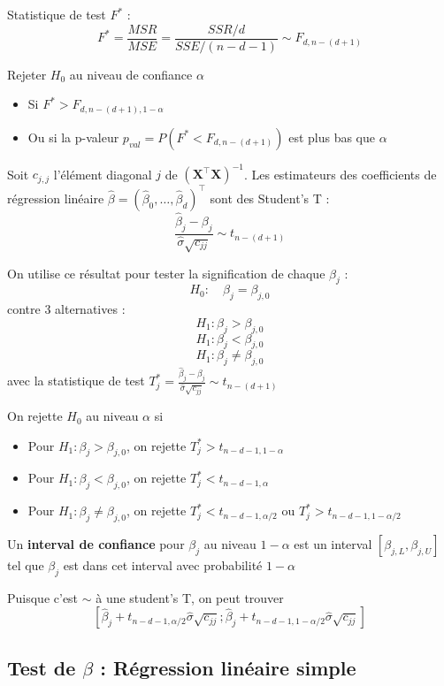 \documentclass[12pt,a4paper]{article}
\begin{document}
Statistique de test $F^*$ :
$$ F^* = \frac{MSR}{MSE} = \frac{SSR / d}{SSE / (n-d-1)} \sim F_{d, n-(d+1)} $$

Rejeter $H_0$ au niveau de confiance $\alpha$
\begin{itemize}
    \item Si $F^* > F_{d,n-(d+1),1-\alpha}$
    \item Ou si la p-valeur $p_{val} = P(F^* < F_{d,n-(d+1)})$ est plus bas que $\alpha$
\end{itemize}

Soit $c_{j,j}$ l'élément diagonal $j$ de $(\mathbf{X}^\top \mathbf{X})^{-1}$. Les estimateurs des coefficients de régression linéaire $\hat{\beta} = (\hat{\beta}_0, \dots, \hat{\beta}_d)^\top$ sont des Student's T :
$$\frac{\hat{\beta}_j - \beta_j}{\hat{\sigma}\sqrt{c_{jj}}} \sim t_{n-(d+1)}$$

\medskip

On utilise ce résultat pour tester la signification de chaque $\beta_j$ :
$$H_0 : \quad \beta_j = \beta_{j,0}$$
contre 3 alternatives :
$$H_1 : \beta_j > \beta_{j,0}$$
$$H_1 : \beta_j < \beta_{j,0}$$
$$H_1 : \beta_j \neq \beta_{j,0}$$
avec la statistique de test $T_j^* = \frac{\hat{\beta}_j - \beta_j}{\hat{\sigma}\sqrt{c_{jj}}} \sim t_{n-(d+1)}$

On rejette $H_0$ au niveau $\alpha$ si
\begin{itemize}
    \item Pour $H_1 : \beta_j > \beta_{j,0}$, on rejette $T_j^* > t_{n-d-1,1-\alpha}$
    \item Pour $H_1 : \beta_j < \beta_{j,0}$, on rejette $T_j^* < t_{n-d-1,\alpha}$
    \item Pour $H_1 : \beta_j \neq \beta_{j,0}$, on rejette $T_j^* < t_{n-d-1,\alpha/2}$ ou $T_j^* > t_{n-d-1,1-\alpha/2}$
\end{itemize}

Un \textbf{interval de confiance} pour $\beta_j$ au niveau $1 - \alpha$ est un interval $[\beta_{j,L},\beta_{j,U}]$ tel que $\beta_j$ est dans cet interval avec probabilité $1-\alpha$

Puisque c'est $\sim$ à une student's T, on peut trouver
$$\left[ \widehat{\beta}_j + t_{n-d-1, \alpha/2} \widehat{\sigma} \sqrt{c_{jj}} ; \widehat{\beta}_j + t_{n-d-1, 1-\alpha/2} \widehat{\sigma} \sqrt{c_{jj}} \right]$$


\subsection{Test de $\beta$ : Régression linéaire simple}
\end{document}
